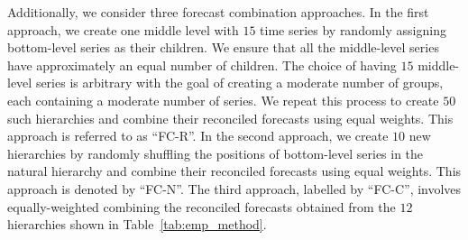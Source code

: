 \documentclass[a4paper,review,12pt,authoryear]{elsarticle}
\begin{document}
\begin{table}
\caption{\label{tab:emp_method} Hierarchy construction approaches used in empirical studies.}
\centering
{}
\end{table}

Additionally, we consider three forecast combination approaches. In the first approach, we create one middle level with $15$ time series by randomly assigning bottom-level series as their children. We ensure that all the middle-level series have approximately an equal number of children. The choice of having $15$ middle-level series is arbitrary with the goal of creating a moderate number of groups, each containing a moderate number of series.
We repeat this process to create $50$ such hierarchies and combine their reconciled forecasts using equal weights. This approach is referred to as ``FC-R''.
In the second approach, we create $10$ new hierarchies by randomly shuffling the positions of bottom-level series in the natural hierarchy and combine their reconciled forecasts using equal weights. This approach is denoted by ``FC-N''. The third approach, labelled by ``FC-C'', involves equally-weighted combining the reconciled forecasts obtained from the $12$ hierarchies shown in Table~\ref{tab:emp_method}.
\end{document}
